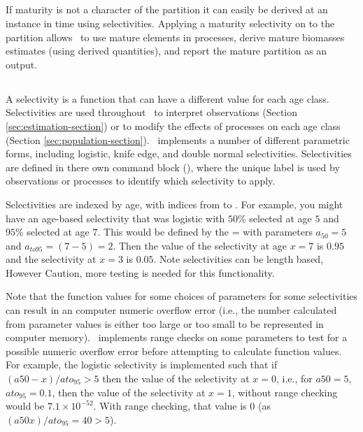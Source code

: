 \subsection{\label{sec:weightless-model}}

\subsection{\label{sec:maturity-notinpartition}}

If maturity is not a character of the partition it can easily be derived at an instance in time using selectivities. Applying a maturity selectivity on to the partition allows \CNAME\ to use mature elements in processes, derive mature biomasses estimates (using derived quantities), and report the mature partition as an output.

\subsection{\label{sec:selectivities}}

A selectivity is a function that can have a different value for each age class. Selectivities are used throughout \CNAME\ to interpret observations (Section \ref{sec:estimation-section}) or to modify the effects of processes on each age class (Section \ref{sec:population-section}). \CNAME\ implements a number of different parametric forms, including logistic, knife edge, and double normal selectivities. Selectivities are defined in there own command block (), where the unique label is used by observations or processes to identify which selectivity to apply.

Selectivities are indexed by age, with indices from  to . For example, you might have an age-based selectivity that was logistic with $50\%$ selected at age $5$ and $95\%$ selected at age $7$. This would be defined by the = with parameters $a_{50}=5$ and $a_{to95}=(7-5)=2$. Then the value of the selectivity at age $x=7$ is $0.95$ and the selectivity at $x=3$ is $0.05$. Note selectivities can be length based, However Caution, more testing is needed for this functionality.

Note that the function values for some choices of parameters for some selectivities can result in an computer numeric overflow error (i.e., the number calculated from parameter values is either too large or too small to be represented in computer memory). \CNAME\ implements range checks on some parameters to test for a possible numeric overflow error before attempting to calculate function values. For example, the logistic selectivity is implemented such that if $(a50-x)/ato_95 > 5$ then the value of the selectivity at $x=0$, i.e., for $a50=5$, $ato_95=0.1$, then the value of the selectivity at $x=1$, without range checking would be $7.1 \times 10^{-52}$. With range checking, that value is $0$ (as $(a50 x)/ato_95=40 > 5$).

